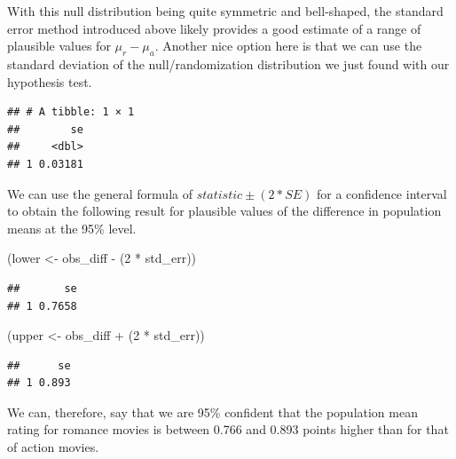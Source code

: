 \documentclass[]{tufte-book}
\newenvironment{Shaded}{\begin{snugshade}}{\end{snugshade}}
\newcommand{\KeywordTok}[1]{\textcolor[rgb]{0.13,0.29,0.53}{\textbf{{#1}}}}
\newcommand{\DataTypeTok}[1]{\textcolor[rgb]{0.13,0.29,0.53}{{#1}}}
\newcommand{\DecValTok}[1]{\textcolor[rgb]{0.00,0.00,0.81}{{#1}}}
\newcommand{\StringTok}[1]{\textcolor[rgb]{0.31,0.60,0.02}{{#1}}}
\newcommand{\NormalTok}[1]{{#1}}
\begin{document}
With this null distribution being quite symmetric and bell-shaped, the
standard error method introduced above likely provides a good estimate
of a range of plausible values for \(\mu_r - \mu_a\). Another nice
option here is that we can use the standard deviation of the
null/randomization distribution we just found with our hypothesis test.

\begin{Shaded}
\end{Shaded}

\begin{verbatim}
## # A tibble: 1 × 1
##        se
##     <dbl>
## 1 0.03181
\end{verbatim}

We can use the general formula of \(statistic \pm (2 * SE)\) for a
confidence interval to obtain the following result for plausible values
of the difference in population means at the 95\% level.

\begin{Shaded}
\begin{Highlighting}[]
\NormalTok{(lower <-}\StringTok{ }\NormalTok{obs_diff -}\StringTok{ }\NormalTok{(}\DecValTok{2} \NormalTok{*}\StringTok{ }\NormalTok{std_err))}
\end{Highlighting}
\end{Shaded}

\begin{verbatim}
##       se
## 1 0.7658
\end{verbatim}

\begin{Shaded}
\begin{Highlighting}[]
\NormalTok{(upper <-}\StringTok{ }\NormalTok{obs_diff +}\StringTok{ }\NormalTok{(}\DecValTok{2} \NormalTok{*}\StringTok{ }\NormalTok{std_err))}
\end{Highlighting}
\end{Shaded}

\begin{verbatim}
##      se
## 1 0.893
\end{verbatim}

We can, therefore, say that we are 95\% confident that the population
mean rating for romance movies is between 0.766 and 0.893 points higher
than for that of action movies.
\end{document}
